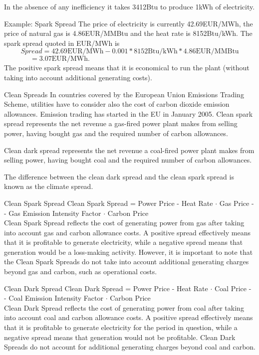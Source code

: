 		In the absence of any inefficiency it takes 3412Btu to produce 1kWh of electricity.


Example: Spark Spread
The price of electricity is currently 42.69EUR/MWh, the price of natural gas is 4.86EUR/MMBtu and the heat rate is 8152Btu/kWh. The spark spread quoted in EUR/MWh is
$$Spread=42.69\text{EUR/MWh}-0.001\ast8152\text{Btu/kWh}\ast4.86\text{EUR/MMBtu}$$
$\,\qquad\quad\;\;=3.07\text{EUR/MWh}.$\\
\vspace{0.2cm}
The positive spark spread means that it is economical to run the plant (without taking into account additional generating costs).


Clean Spreads
In countries covered by the European Union Emissions Trading Scheme, utilities have to consider also the cost of carbon dioxide emission allowances. Emission trading has started in the EU in January 2005.
	Clean spark spread represents the net revenue a gas-fired power plant makes from selling power, having bought gas and the required number of carbon allowances.
  
	Clean dark spread represents the net revenue a coal-fired power plant makes from selling power, having bought coal and the required number of carbon allowances.
  
	The difference between the clean dark spread and the clean spark spread is known as the climate spread.


Clean Spark Spread
	Clean Spark Spread = Power Price - Heat Rate $\cdot$ Gas Price -\\- Gas Emission Intensity Factor $\cdot$ Carbon Price\\
  \vspace{0.6cm}
	Clean Spark Spread reflects the cost of generating power from gas after taking into account gas and carbon allowance costs. A positive spread effectively means that it is profitable to 
	generate electricity, while a negative spread means that generation would be a loss-making activity. However, it is important to note that the Clean Spark Spreads do not take into account additional 
	generating charges beyond gas and carbon, such as operational costs.


Clean Dark Spread
Clean Dark Spread = Power Price - Heat Rate $\cdot$ Coal Price -\\- Coal Emission Intensity Factor $\cdot$ Carbon Price\\
  \vspace{0.6cm}
Clean Dark Spread reflects the cost of generating power from coal after taking into account coal and carbon allowance costs. A positive spread effectively means that it is profitable to generate electricity for the period in question, while a negative spread means that generation would not be profitable. Clean Dark Spreads do not account for additional generating charges beyond coal and carbon.


